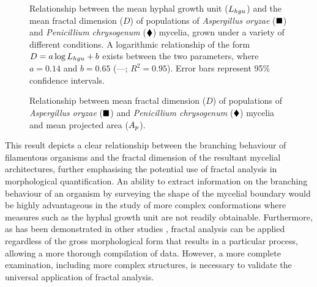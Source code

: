 \begin{figure}[t]
	\centering
	\caption{Relationship between the mean hyphal growth unit ($L_{hgu}$) and the mean fractal dimension ($D$) of populations of \emph{Aspergillus oryzae} ($\blacksquare$) and \emph{Penicillium chrysogenum} ($\blacklozenge$) mycelia, grown under a variety of different conditions. A logarithmic relationship of the form $D=a \log L_{hgu} +b$ exists between the two parameters, where $a=0.14$ and $b=0.65$ (---; $R^2=0.95$). Error bars represent 95\% confidence intervals.}
	\label{fig:DLhgu}
\end{figure}

\begin{figure}[htbp]
	\centering
	\caption{Relationship between mean fractal dimension ($D$) of populations of \emph{Aspergillus oryzae} ($\blacksquare$) and \emph{Penicillium chrysogenum} ($\blacklozenge$) mycelia and mean projected area ($A_p$).}
	\label{fig:DAp}
\end{figure}

This result depicts a clear relationship between the branching behaviour of filamentous organisms and the fractal dimension of the resultant mycelial architectures, further emphasising the potential use of fractal analysis in morphological quantification. An ability to extract information on the branching behaviour of an organism by surveying the shape of the mycelial boundary would be highly advantageous in the study of more complex conformations where measures such as the hyphal growth unit are not readily obtainable. Furthermore, as has been demonstrated in other studies \cite{papagianni2006b,cpark2007,jckim2005,jones1993a}, fractal analysis can be applied regardless of the gross morphological form that results in a particular process, allowing a more thorough compilation of data. However, a more complete examination, including more complex structures, is necessary to validate the universal application of fractal analysis.

